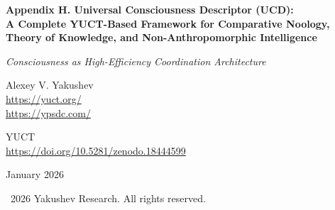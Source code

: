 \documentclass[12pt,a4paper]{article}
\DeclareRobustCommand{\alD}{\texorpdfstring{\ensuremath{\alpha_{\mathrm{D}}}}{alpha_D}}
\DeclareRobustCommand{\beI}{\texorpdfstring{\ensuremath{\beta_{\mathrm{I}}}}{beta_I}}
\DeclareRobustCommand{\gaR}{\texorpdfstring{\ensuremath{\gamma_{\mathrm{R}}}}{gamma_R}}
\newcommand{\eff}{\mathrm{eff}}
\newcommand{\Ke}{K_{\eff}}
\begin{document}
	
	\begin{titlepage}
		\begin{center}
			\vspace*{0cm}
			
			\Huge\textbf{Appendix H. Universal Consciousness Descriptor (UCD):\\ A Complete YUCT-Based Framework for Comparative Noology,\\ Theory of Knowledge, and Non-Anthropomorphic Intelligence}
			
			\vspace{1cm}
			
			\small\textit{Consciousness as High-Efficiency Coordination Architecture}
			
			\vspace{1cm}
			\Large
			Alexey V. Yakushev\\
			
			\url{https://yuct.org/}\\
			\url{https://ypsdc.com/}
			
			\vspace{2cm}
			\large YUCT \\ 
			\url{https://doi.org/10.5281/zenodo.18444599}\\
			\vspace{1cm}
			
			\vspace{0cm}
			\large
			January 2026
			
			\vspace{6cm}
			\textcopyright~2026 Yakushev Research. All rights reserved.
			
			\newpage
			
			\begin{abstract}
				\noindent
				This paper presents the complete Unified Consciousness-Knowledge Framework integrating the Universal Consciousness Descriptor (UCD) with the Yakushev United Coordination Theory (YUCT). Building upon the fundamental insight that consciousness/intelligence/mind is a high-efficiency (\(\Ke \gg 1\)) coordination architecture, we develop: (1) A complete mathematical formulation of the D+I\(\cdot\)R triad as the fundamental decomposition of any cognitive agent; (2) Three spectral parameters (\alD, \beI, \gaR) for quantitative comparison across species and substrates; (3) A theory of knowledge as coordinated information processing; (4) Detailed experimental protocols for measuring consciousness in biological, artificial, and extraterrestrial systems; (5) Specific predictions for astrophysical SETI 2.0 searches; (6) Comparison with existing theories of consciousness (IIT, Global Workspace, Predictive Processing); (7) Ethical implications and practical applications in medicine, AI safety, and cybersecurity; (8) Complete mathematical proofs including theorems on cognitive hierarchy, upper limits of coordination efficiency, and computational complexity bounds. The framework resolves long-standing philosophical problems while providing testable predictions across 15+ experimental domains.
			\end{abstract}
			

\end{center}
\end{titlepage}
\end{document}
